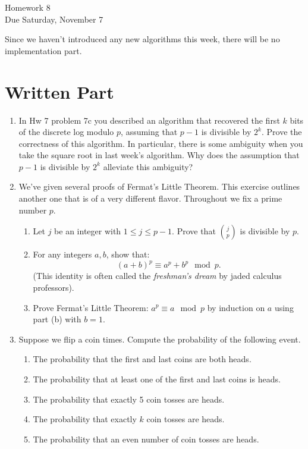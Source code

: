 \documentclass[11pt]{article}
\begin{document}
\begin{center}
\Large {Homework 8}\\
\small {Due Saturday, November 7}
\end{center}
Since we haven't introduced any new algorithms this week, there will be no implementation part.
\section*{Written Part}
\begin{enumerate}
  \item{
  In Hw 7 problem 7c you described an algorithm that recovered the first $k$ bits of the discrete log modulo $p$, assuming that $p-1$ is divisible by $2^k$.  Prove the correctness of this algorithm.  In particular, there is some ambiguity when you take the square root in last week's algorithm.  Why does the assumption that $p-1$ is divisible by $2^k$ alleviate this ambiguity?
  }
  \item{
  We've given several proofs of Fermat's Little Theorem.  This exercise outlines another one that is of a very different flavor.  Throughout we fix a prime number $p$.
  \begin{enumerate}
    \item{
    Let $j$ be an integer with $1\le j\le p-1$.  Prove that $j\choose p$ is divisible by $p$.
    }
    \item{
    For any integers $a,b$, show that:
    \[(a+b)^p\equiv a^p + b^p\mod p.\]
    (This identity is often called the \textit{freshman's dream} by jaded calculus professors).
    }
    \item{
    Prove Fermat's Little Theorem: $a^p\equiv a\mod p$ by induction on $a$ using part (b) with $b=1$.
    }
  \end{enumerate}
  }
  \item{
  Suppose we flip a coin times.  Compute the probability of the following event.
  \begin{enumerate}
    \item{
    The probability that the first and last coins are both heads.
    }
    \item{
    The probability that at least one of the first and last coins is heads.
    }
    \item{
    The probability that exactly 5 coin tosses are heads.
    }
    \item{
    The probability that exactly $k$ coin tosses are heads.
    }
    \item{
    The probability that an even number of coin tosses are heads.
}
\end{enumerate}}
\end{enumerate}
\end{document}
